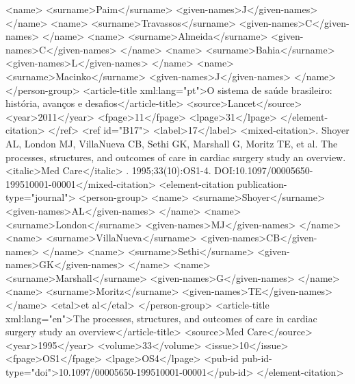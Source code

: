             <name>
              <surname>Paim</surname>
              <given-names>J</given-names>
            </name>
            <name>
              <surname>Travassos</surname>
              <given-names>C</given-names>
            </name>
            <name>
              <surname>Almeida</surname>
              <given-names>C</given-names>
            </name>
            <name>
              <surname>Bahia</surname>
              <given-names>L</given-names>
            </name>
            <name>
              <surname>Macinko</surname>
              <given-names>J</given-names>
            </name>
          </person-group>
          <article-title xml:lang="pt">O sistema de saúde brasileiro: história, avanços e
            desafios</article-title>
          <source>Lancet</source>
          <year>2011</year>
          <fpage>11</fpage>
          <lpage>31</lpage>
        </element-citation>
      </ref>
      <ref id="B17">
        <label>17</label>
        <mixed-citation>. Shoyer AL, London MJ, VillaNueva CB, Sethi GK, Marshall G, Moritz TE, et
          al. The processes, structures, and outcomes of care in cardiac surgery study an overview.
            <italic>Med Care</italic> . 1995;33(10):OS1-4.
          DOI:10.1097/00005650-199510001-00001</mixed-citation>
        <element-citation publication-type="journal">
          <person-group>
            <name>
              <surname>Shoyer</surname>
              <given-names>AL</given-names>
            </name>
            <name>
              <surname>London</surname>
              <given-names>MJ</given-names>
            </name>
            <name>
              <surname>VillaNueva</surname>
              <given-names>CB</given-names>
            </name>
            <name>
              <surname>Sethi</surname>
              <given-names>GK</given-names>
            </name>
            <name>
              <surname>Marshall</surname>
              <given-names>G</given-names>
            </name>
            <name>
              <surname>Moritz</surname>
              <given-names>TE</given-names>
            </name>
            <etal>et al</etal>
          </person-group>
          <article-title xml:lang="en">The processes, structures, and outcomes of care in cardiac
            surgery study an overview</article-title>
          <source>Med Care</source>
          <year>1995</year>
          <volume>33</volume>
          <issue>10</issue>
          <fpage>OS1</fpage>
          <lpage>OS4</lpage>
          <pub-id pub-id-type="doi">10.1097/00005650-199510001-00001</pub-id>
        </element-citation>
